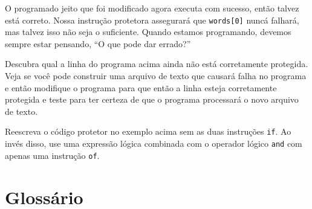 \begin{enumerate}
O programado jeito que foi modificado agora executa com sucesso, então talvez está correto.
Nossa instrução protetora assegurará que {\tt words[0]} nuncá falhará,
mas talvez isso não seja o suficiente. Quando estamos programando, devemos sempre estar pensando,
``O que pode dar errado?''


\begin{ex}
Descubra qual a linha do programa acima ainda não está corretamente protegida.
Veja se você pode construir uma arquivo de texto que causará falha no programa e
então modifique o programa para que então a linha esteja corretamente protegida e
teste para ter certeza de que o programa processará o novo arquivo de texto.
\end{ex}

\begin{ex}
Reescreva o código protetor no exemplo acima sem as duas instruções {\tt if}. Ao invés
disso, use uma expressão lógica combinada com o operador lógico {\tt and} com apenas uma
instrução {\tt of}.
\end{ex}

\end{enumerate}





\section{Glossário}


